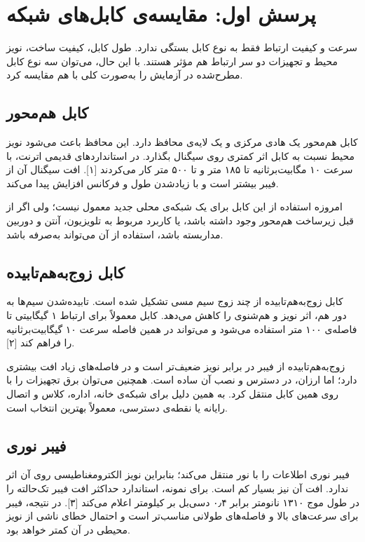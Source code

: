 \section{پرسش اول: مقایسه‌ی کابل‌های شبکه}

سرعت و کیفیت ارتباط فقط به نوع کابل بستگی ندارد.
طول کابل، کیفیت ساخت، نویز محیط و تجهیزات دو سر ارتباط هم مؤثر هستند.
با این حال، می‌توان سه نوع کابل مطرح‌شده در آزمایش را به‌صورت کلی با هم مقایسه کرد.

\subsection{کابل هم‌محور}

کابل هم‌محور یک هادی مرکزی و یک لایه‌ی محافظ دارد.
این محافظ باعث می‌شود نویز محیط نسبت به کابل  اثر کمتری روی سیگنال بگذارد.
در استانداردهای قدیمی اترنت،  با سرعت ۱۰ مگابیت‌برثانیه تا ۱۸۵ متر و  تا ۵۰۰ متر کار می‌کردند [۱].
افت سیگنال آن از فیبر بیشتر است و با زیادشدن طول و فرکانس افزایش پیدا می‌کند.

امروزه استفاده از این کابل برای یک شبکه‌ی محلی جدید معمول نیست؛
ولی اگر از قبل زیرساخت هم‌محور وجود داشته باشد، یا کاربرد مربوط به تلویزیون، آنتن و دوربین مداربسته باشد، استفاده از آن می‌تواند به‌صرفه باشد.

\subsection{کابل زوج‌به‌هم‌تابیده}

کابل زوج‌به‌هم‌تابیده از چند زوج سیم مسی تشکیل شده است.
تابیده‌شدن سیم‌ها به دور هم، اثر نویز و هم‌شنوی را کاهش می‌دهد.
کابل  معمولاً برای ارتباط ۱ گیگابیتی تا فاصله‌ی ۱۰۰ متر استفاده می‌شود و  می‌تواند در همین فاصله سرعت ۱۰ گیگابیت‌برثانیه را فراهم کند [۲].

زوج‌به‌هم‌تابیده از فیبر در برابر نویز ضعیف‌تر است و در فاصله‌های زیاد افت بیشتری دارد؛
اما ارزان، در دسترس و نصب آن ساده است.
همچنین می‌توان برق تجهیزات را با  روی همین کابل منتقل کرد.
به همین دلیل برای شبکه‌ی خانه، اداره، کلاس و اتصال رایانه یا نقطه‌ی دسترسی، معمولاً بهترین انتخاب است.

\subsection{فیبر نوری}

فیبر نوری اطلاعات را با نور منتقل می‌کند؛ بنابراین نویز الکترومغناطیسی روی آن اثر ندارد.
افت آن نیز بسیار کم است.
برای نمونه، استاندارد  حداکثر افت فیبر تک‌حالته را در طول موج ۱۳۱۰ نانومتر برابر ۰٫۴ دسی‌بل بر کیلومتر اعلام می‌کند [۳].
در نتیجه، فیبر برای سرعت‌های بالا و فاصله‌های طولانی مناسب‌تر است و احتمال خطای ناشی از نویز محیطی در آن کمتر خواهد بود.

